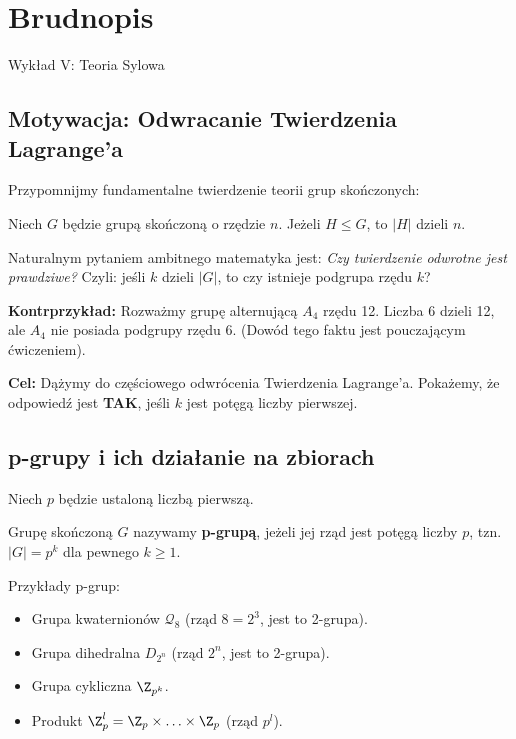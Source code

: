 \chapter{Brudnopis}

Wykład V: Teoria Sylowa

\section{Motywacja: Odwracanie Twierdzenia Lagrange'a}

Przypomnijmy fundamentalne twierdzenie teorii grup skończonych:

\begin{theorem}[Lagrange'a]
    Niech $G$ będzie grupą skończoną o rzędzie $n$. Jeżeli $H \le G$, to $|H|$ dzieli $n$.
\end{theorem}

Naturalnym pytaniem ambitnego matematyka jest: \textit{Czy twierdzenie odwrotne jest prawdziwe?}
Czyli: jeśli $k$ dzieli $|G|$, to czy istnieje podgrupa rzędu $k$?

\begin{context}
    \textbf{Kontrprzykład:}
    Rozważmy grupę alternującą $A_4$ rzędu 12. Liczba 6 dzieli 12, ale $A_4$ nie posiada podgrupy rzędu 6.
    (Dowód tego faktu jest pouczającym ćwiczeniem).
\end{context}

\textbf{Cel:} Dążymy do częściowego odwrócenia Twierdzenia Lagrange'a. Pokażemy, że odpowiedź jest \textbf{TAK}, jeśli $k$ jest potęgą liczby pierwszej.

\section{p-grupy i ich działanie na zbiorach}

Niech $p$ będzie ustaloną liczbą pierwszą.

\begin{definition}[p-grupa]
    Grupę skończoną $G$ nazywamy \textbf{p-grupą}, jeżeli jej rząd jest potęgą liczby $p$, tzn. $|G| = p^k$ dla pewnego $k \ge 1$.
\end{definition} 

\begin{eg}
    Przykłady p-grup:
    \begin{itemize}
        \item Grupa kwaternionów $\mathcal{Q}_{8}$ (rząd $8=2^3$, jest to 2-grupa).
        \item Grupa dihedralna $D_{2^{n}}$ (rząd $2^n$, jest to 2-grupa).
        \item Grupa cykliczna $\Z_{p^{k}}$.
        \item Produkt $\Z_{p}^{l} = \Z_{p}\times \ldots\times \Z_{p}$ (rząd $p^l$).
    \end{itemize}
\end{eg} 

